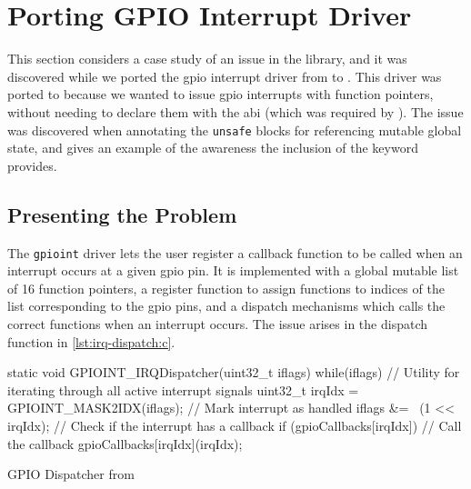 
\section{Porting GPIO Interrupt Driver}
\label{sec:porting-gpioint}

This section considers a case study of an issue in the {\emdrv} library, and it was discovered while we ported the \gls{gpio} interrupt driver from {\C} to {\rust}.
This driver was ported to {\rust} because we wanted to issue \gls{gpio} interrupts with {\rust} function pointers, without needing to declare them with the {\C} \gls{abi} (which was required by {\emdrv}).
The issue was discovered when annotating the \texttt{unsafe} blocks for referencing mutable global state, and gives an example of the awareness the inclusion of the {\unsafe} keyword provides.

\subsection{Presenting the Problem}

The \texttt{gpioint} driver lets the user register a callback function to be called when an interrupt occurs at a given \gls{gpio} pin.
It is implemented with a global mutable list of 16 function pointers, a register function to assign functions to indices of the list corresponding to the \gls{gpio} pins, and a dispatch mechanisms which calls the correct functions when an interrupt occurs.
The issue arises in the dispatch function in \autoref{lst:irq-dispatch:c}.

\begin{listing}
  \begin{ccode}
static void GPIOINT_IRQDispatcher(uint32_t iflags) {
  while(iflags) {
    // Utility for iterating through all active interrupt signals
    uint32_t irqIdx = GPIOINT_MASK2IDX(iflags);
    // Mark interrupt as handled
    iflags &= ~(1 << irqIdx);
    // Check if the interrupt has a callback
    if (gpioCallbacks[irqIdx]) {
      // Call the callback
      gpioCallbacks[irqIdx](irqIdx);
    }
  }
}
  \end{ccode}
  \caption{GPIO Dispatcher from {\emlib}}
  \label{lst:irq-dispatch:c}
\end{listing}

